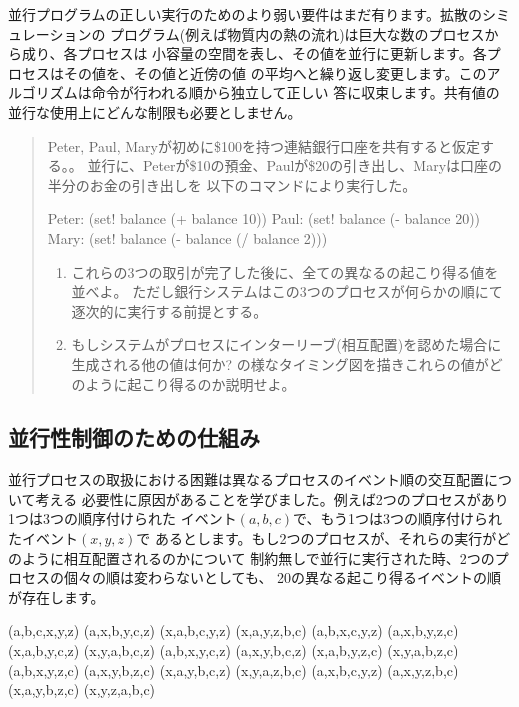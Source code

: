 並行プログラムの正しい実行のためのより弱い要件はまだ有ります。拡散のシミュレーションの
プログラム(例えば物質内の熱の流れ)は巨大な数のプロセスから成り、各プロセスは
小容量の空間を表し、その値を並行に更新します。各プロセスはその値を、その値と近傍の値
の平均へと繰り返し変更します。このアルゴリズムは命令が行われる順から独立して正しい
答に収束します。共有値の並行な使用上にどんな制限も必要としません。

\begin{quote}
Peter, Paul, Maryが初めに\$100を持つ連結銀行口座を共有すると仮定する。。
並行に、Peterが\$10の預金、Paulが\$20の引き出し、Maryは口座の半分のお金の引き出しを
以下のコマンドにより実行した。

\begin{example}
Peter: (set! balance (+ balance 10))
Paul:  (set! balance (- balance 20))
Mary:  (set! balance (- balance (/ balance 2)))
\end{example}

\begin{enumerate}[a]

\item
これらの3つの取引が完了した後に、全ての異なるの起こり得る値を並べよ。
ただし銀行システムはこの3つのプロセスが何らかの順にて逐次的に実行する前提とする。

\item
もしシステムがプロセスにインターリーブ(相互配置)を認めた場合に生成される他の値は何か?
の様なタイミング図を描きこれらの値がどのように起こり得るのか説明せよ。
\end{enumerate}
\end{quote}

\subsection{並行性制御のための仕組み}
\label{Section 3.4.2}


並行プロセスの取扱における困難は異なるプロセスのイベント順の交互配置について考える
必要性に原因があることを学びました。例えば2つのプロセスがあり1つは3つの順序付けられた
イベント\( (a, b, c) \)で、もう1つは3つの順序付けられたイベント\( (x, y, z) \)で
あるとします。もし2つのプロセスが、それらの実行がどのように相互配置されるのかについて
制約無しで並行に実行された時、2つのプロセスの個々の順は変わらないとしても、
20の異なる起こり得るイベントの順が存在します。

\begin{example}
(a,b,c,x,y,z)  (a,x,b,y,c,z)  (x,a,b,c,y,z)  (x,a,y,z,b,c)
(a,b,x,c,y,z)  (a,x,b,y,z,c)  (x,a,b,y,c,z)  (x,y,a,b,c,z)
(a,b,x,y,c,z)  (a,x,y,b,c,z)  (x,a,b,y,z,c)  (x,y,a,b,z,c)
(a,b,x,y,z,c)  (a,x,y,b,z,c)  (x,a,y,b,c,z)  (x,y,a,z,b,c)
(a,x,b,c,y,z)  (a,x,y,z,b,c)  (x,a,y,b,z,c)  (x,y,z,a,b,c)
\end{example}


